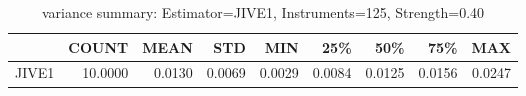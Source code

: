 \begin{table}[ht]
\centering
\caption{variance summary: Estimator=JIVE1, Instruments=125, Strength=0.40}
\begin{tabular}{lrrrrrrrr}
\toprule
 & COUNT & MEAN & STD & MIN & 25\% & 50\% & 75\% & MAX \\
\midrule
JIVE1 & 10.0000 & 0.0130 & 0.0069 & 0.0029 & 0.0084 & 0.0125 & 0.0156 & 0.0247 \\
\bottomrule
\end{tabular}
\end{table}
